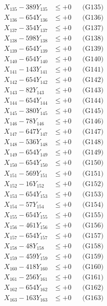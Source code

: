 \documentclass[a4paper,10pt]{article}
\begin{document}
{\begin{align}
X_{135} - 389Y_{135} &\leq +0 && \text{(G135)} \\
X_{136} - 654Y_{136} &\leq +0 && \text{(G136)} \\
X_{137} - 354Y_{137} &\leq +0 && \text{(G137)} \\
X_{138} - 598Y_{138} &\leq +0 && \text{(G138)} \\
X_{139} - 654Y_{139} &\leq +0 && \text{(G139)} \\
X_{140} - 654Y_{140} &\leq +0 && \text{(G140)} \\
\allowbreak
X_{141} - 143Y_{141} &\leq +0 && \text{(G141)} \\
X_{142} - 654Y_{142} &\leq +0 && \text{(G142)} \\
X_{143} - 82Y_{143} &\leq +0 && \text{(G143)} \\
X_{144} - 654Y_{144} &\leq +0 && \text{(G144)} \\
X_{145} - 380Y_{145} &\leq +0 && \text{(G145)} \\
X_{146} - 78Y_{146} &\leq +0 && \text{(G146)} \\
X_{147} - 647Y_{147} &\leq +0 && \text{(G147)} \\
X_{148} - 536Y_{148} &\leq +0 && \text{(G148)} \\
X_{149} - 654Y_{149} &\leq +0 && \text{(G149)} \\
X_{150} - 654Y_{150} &\leq +0 && \text{(G150)} \\
\allowbreak
X_{151} - 569Y_{151} &\leq +0 && \text{(G151)} \\
X_{152} - 16Y_{152} &\leq +0 && \text{(G152)} \\
X_{153} - 654Y_{153} &\leq +0 && \text{(G153)} \\
X_{154} - 57Y_{154} &\leq +0 && \text{(G154)} \\
X_{155} - 654Y_{155} &\leq +0 && \text{(G155)} \\
X_{156} - 461Y_{156} &\leq +0 && \text{(G156)} \\
X_{157} - 654Y_{157} &\leq +0 && \text{(G157)} \\
X_{158} - 48Y_{158} &\leq +0 && \text{(G158)} \\
X_{159} - 459Y_{159} &\leq +0 && \text{(G159)} \\
X_{160} - 418Y_{160} &\leq +0 && \text{(G160)} \\
\allowbreak
X_{161} - 256Y_{161} &\leq +0 && \text{(G161)} \\
X_{162} - 654Y_{162} &\leq +0 && \text{(G162)} \\
X_{163} - 163Y_{163} &\leq +0 && \text{(G163)} \\

\end{align}}
\end{document}
